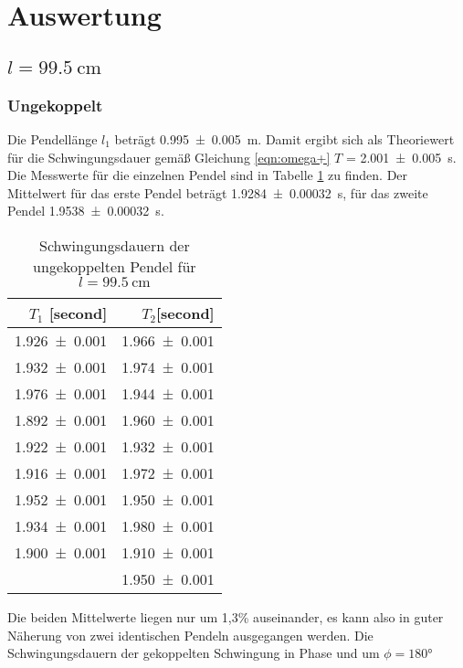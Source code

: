 \section{Auswertung}
\label{sec:Auswertung}
\subsection{$l = \SI{99.5}{\centi\meter}$}
\subsubsection{Ungekoppelt}
Die Pendellänge $l_1$ beträgt \SI{0.995 +- 0.005}{\meter}. Damit ergibt
sich als Theoriewert für die Schwingungsdauer gemäß Gleichung \ref{eqn:omega+}
$T$ = \SI{2.001 +- 0.005}{\second}. Die Messwerte für die einzelnen Pendel
sind in Tabelle \ref{tab:l1ungekoppelt} zu finden.
Der Mittelwert für das erste Pendel beträgt \SI{1.9284 +- 0.00032}{\second}, für
das zweite Pendel \SI{1.9538 +- 0.00032}{\second}.
\begin{table}
 \noindent
 \centering
 \caption{Schwingungsdauern der ungekoppelten
 Pendel für $l = \SI{99.5}{\centi\meter}$}
 \label{tab:l1ungekoppelt}
 \begin{tabular}{rr}
 \toprule
  {$T_1$ [\si{second}]} & {$T_2$[\si{second}]} \\
 \midrule
    \num{1.926 +- 0.001} & \num{1.966 +- 0.001} \\
    \num{1.932 +- 0.001} & \num{1.974 +- 0.001}\\
    \num{1.976 +- 0.001} & \num{1.944 +- 0.001}\\
    \num{1.892 +- 0.001} & \num{1.960 +- 0.001}\\
    \num{1.922 +- 0.001} & \num{1.932 +- 0.001}\\
    \num{1.916 +- 0.001} & \num{1.972 +- 0.001}\\
    \num{1.952 +- 0.001} & \num{1.950 +- 0.001}\\
    \num{1.934 +- 0.001} & \num{1.980 +- 0.001}\\
    \num{1.900 +- 0.001} & \num{1.910 +- 0.001}\\
    \num{1.934 +- 0.001] & \num{1.950 +- 0.001}\\
 \bottomrule
 \end{tabular}
\end{table}
Die beiden Mittelwerte liegen nur um 1,3\% auseinander, es kann also in guter
Näherung von zwei identischen Pendeln ausgegangen werden.
Die Schwingungsdauern der gekoppelten Schwingung in Phase und um $\phi=180°$
